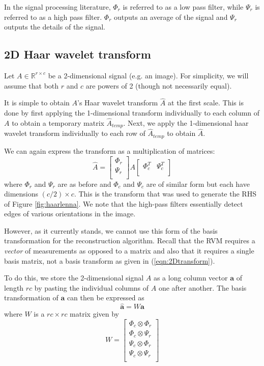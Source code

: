\documentclass[final,3p]{report}
\let\bs\boldsymbol
\begin{document}
In the signal processing literature, $\Phi_r$ is referred to as a low pass filter, while $\Psi_r$ is referred to as a high pass filter.
$\Phi_r$ outputs an average of the signal and $\Psi_r$ outputs the details of the signal.

\subsection{2D Haar wavelet transform}
Let $A \in \mathbb{R}^{r\times c}$ be a 2-dimensional signal (e.g. an image).
For simplicity, we will assume that both $r$ and $c$ are powers of 2 (though not necessarily equal).

It is simple to obtain $A$'s Haar wavelet transform $\hat{A}$ at the first scale.
This is done by first applying the 1-dimensional transform individually to each column of $A$ to obtain a temporary matrix $\hat A_{temp}$.
Next, we apply the 1-dimensional haar wavelet transform individually to each row of $\hat A_{temp}$ to obtain $\hat A$.

We can again express the transform as a multiplication of matrices:
\begin{equation}
\label{eqn:2Dtransform}
\hat A = \begin{bmatrix}
  \Phi_r\\
  \Psi_r\\
\end{bmatrix}
A
\begin{bmatrix}
  \Phi_c^T & \Psi_c^T\\
\end{bmatrix}
\end{equation}
where $\Phi_r$ and $\Psi_r$ are as before and $\Phi_c$ and $\Psi_c$ are of similar form but each have dimensions $(c/2)\times c$.
This is the transform that was used to generate the RHS of Figure \ref{fig:haarlenna}.
We note that the high-pass filters essentially detect edges of various orientations in the image.

However, as it currently stands, we cannot use this form of the basis transformation for the reconstruction algorithm. Recall that the RVM requires a \emph{vector} of measurements as opposed to a matrix and also that it requires a single basis matrix, not a basis transform as given in (\ref{eqn:2Dtransform}).

To do this, we store the 2-dimensional signal $A$ as a long column vector $\bs a$ of length $rc$ by pasting the individual columns of $A$ one after another.
The basis transformation of $\bs a$ can then be expressed as 
\begin{equation*}
\hat{\bs a} = W \bs a
\end{equation*}
where $W$ is a $rc \times rc $ matrix given by
\begin{equation*}
W = 
\begin{bmatrix}
\Phi_c \otimes \Phi_r \\
\Phi_c \otimes \Psi_r \\
\Psi_c \otimes \Phi_r \\
\Psi_c \otimes \Psi_r \\
\end{bmatrix}
\end{equation*}
\end{document}
